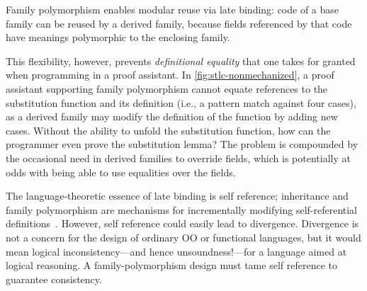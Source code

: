 Family polymorphism enables modular reuse via late binding:
code of a base family can be reused by a derived family,
because fields referenced by that code have meanings polymorphic to the
enclosing family.

This flexibility, however, prevents \emph{definitional equality}
that one takes for granted when programming in a proof assistant.
In \cref{fig:stlc-nonmechanized}, a proof assistant supporting family
polymorphism cannot equate references to the substitution function and
its definition (i.e., a pattern match against four cases),
as a derived family may modify the definition of the function by adding
new cases.
Without the ability to unfold the substitution function, how can the
programmer even prove the substitution lemma?
%
The problem is compounded by the occasional need in derived families to override fields,
which is potentially at odds with being able to use equalities over the fields.



The language-theoretic essence of late binding is self reference;
inheritance and family polymorphism are mechanisms for
incrementally modifying self-referential definitions~\cite{cook1990inheritance}.
However, self reference could easily lead to divergence.
Divergence is not a concern for the design of ordinary OO or
functional languages, but it would mean logical inconsistency---and
hence unsoundness!---for a language aimed at logical reasoning.
A family-polymorphism design must tame self reference to guarantee consistency.

